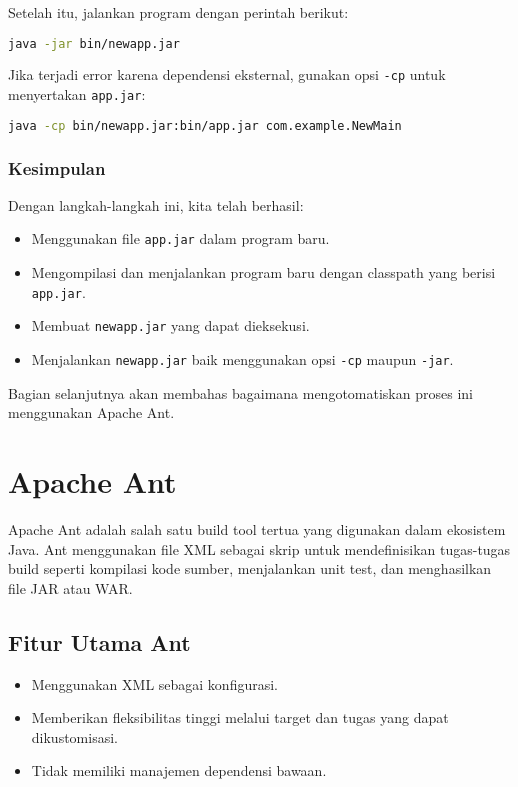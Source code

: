 Setelah itu, jalankan program dengan perintah berikut:

\begin{lstlisting}[language=bash]
	java -jar bin/newapp.jar
\end{lstlisting}

Jika terjadi error karena dependensi eksternal, gunakan opsi \texttt{-cp} untuk menyertakan \texttt{app.jar}:

\begin{lstlisting}[language=bash]
	java -cp bin/newapp.jar:bin/app.jar com.example.NewMain
\end{lstlisting}

\subsubsection{Kesimpulan}
Dengan langkah-langkah ini, kita telah berhasil:
\begin{itemize}
	\item Menggunakan file \texttt{app.jar} dalam program baru.
	\item Mengompilasi dan menjalankan program baru dengan classpath yang berisi \texttt{app.jar}.
	\item Membuat \texttt{newapp.jar} yang dapat dieksekusi.
	\item Menjalankan \texttt{newapp.jar} baik menggunakan opsi \texttt{-cp} maupun \texttt{-jar}.
\end{itemize}

Bagian selanjutnya akan membahas bagaimana mengotomatiskan proses ini menggunakan Apache Ant.


\section{Apache Ant}
Apache Ant adalah salah satu build tool tertua yang digunakan dalam ekosistem Java. Ant menggunakan file XML sebagai skrip untuk mendefinisikan tugas-tugas build seperti kompilasi kode sumber, menjalankan unit test, dan menghasilkan file JAR atau WAR.

\subsection{Fitur Utama Ant}
\begin{itemize}
	\item Menggunakan XML sebagai konfigurasi.
	\item Memberikan fleksibilitas tinggi melalui target dan tugas yang dapat dikustomisasi.
	\item Tidak memiliki manajemen dependensi bawaan.
\end{itemize}

